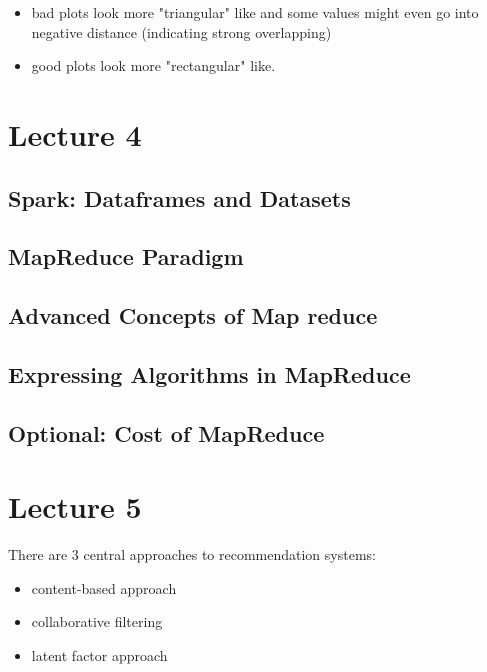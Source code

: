 \documentclass[]{article}
\begin{document}
\begin{itemize}
\item bad plots look more "triangular" like and some values might even go into negative distance (indicating strong overlapping)
\item good plots look more "rectangular" like.
\end{itemize}


\section{Lecture 4}

\subsection{Spark: Dataframes and Datasets}

\subsection{MapReduce Paradigm}

\subsection{Advanced Concepts of Map reduce}

\subsection{Expressing Algorithms in MapReduce}

\subsection{Optional: Cost of MapReduce}


\section{Lecture 5}
There are $3$ central approaches to recommendation systems:
\begin{itemize}
\item content-based approach
\item collaborative filtering
\item latent factor approach
\end{itemize}
\end{document}
